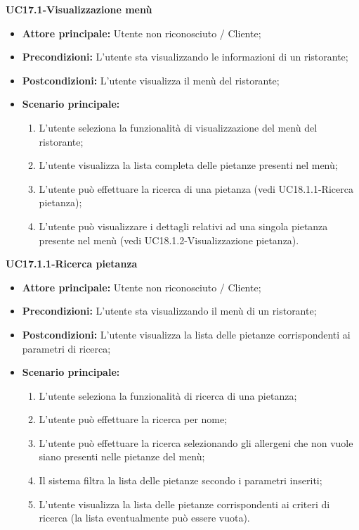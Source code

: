 \pagebreak
\textbf{UC17.1-Visualizzazione menù}
\begin{itemize}
\item \textbf{Attore principale:} Utente non riconosciuto / Cliente;
\item \textbf{Precondizioni:} L'utente sta visualizzando le informazioni di un ristorante;
\item \textbf{Postcondizioni:} L'utente visualizza il menù del ristorante;
\item \textbf{Scenario principale:}
\begin{enumerate}
    \item L'utente seleziona la funzionalità di visualizzazione del menù del ristorante;
    \item L'utente visualizza la lista completa delle pietanze presenti nel menù;
    \item L'utente può effettuare la ricerca di una pietanza (vedi UC18.1.1-Ricerca pietanza);
    \item L'utente può visualizzare i dettagli relativi ad una singola pietanza presente nel menù (vedi UC18.1.2-Visualizzazione pietanza).
\end{enumerate}
\end{itemize}

\textbf{UC17.1.1-Ricerca pietanza}
\begin{itemize}
\item \textbf{Attore principale:} Utente non riconosciuto / Cliente;
\item \textbf{Precondizioni:} L'utente sta visualizzando il menù di un ristorante;
\item \textbf{Postcondizioni:} L'utente visualizza la lista delle pietanze corrispondenti ai parametri di ricerca;
\item \textbf{Scenario principale:}
\begin{enumerate}
    \item L'utente seleziona la funzionalità di ricerca di una pietanza;
    \item L'utente può effettuare la ricerca per nome;
    \item L'utente può effettuare la ricerca selezionando gli allergeni che non vuole siano presenti nelle pietanze del menù;
    \item Il sistema filtra la lista delle pietanze secondo i parametri inseriti;
    \item L'utente visualizza la lista delle pietanze corrispondenti ai criteri di ricerca (la lista eventualmente può essere vuota).
\end{enumerate}
\end{itemize}

